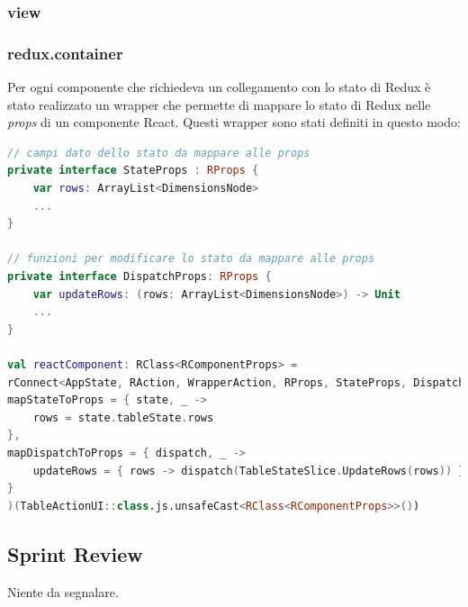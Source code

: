 \subsubsection{view}
\begin{minipage}{\linewidth}
\end{minipage}
\subsubsection{redux.container}
Per ogni componente che richiedeva un collegamento con lo stato di Redux è stato realizzato un wrapper che permette di mappare lo stato di Redux nelle \emph{props} di un componente React. Questi wrapper sono stati definiti in questo modo:
\begin{lstlisting}[caption={BodyCells}, label={lst:bodycells}, language=Kotlin]
// campi dato dello stato da mappare alle props
private interface StateProps : RProps {
	var rows: ArrayList<DimensionsNode>
	...
}

// funzioni per modificare lo stato da mappare alle props
private interface DispatchProps: RProps {
	var updateRows: (rows: ArrayList<DimensionsNode>) -> Unit
	...
}

val reactComponent: RClass<RComponentProps> =
rConnect<AppState, RAction, WrapperAction, RProps, StateProps, DispatchProps, RComponentProps>(
mapStateToProps = { state, _ ->
	rows = state.tableState.rows
},
mapDispatchToProps = { dispatch, _ ->
	updateRows = { rows -> dispatch(TableStateSlice.UpdateRows(rows)) }
}
)(TableActionUI::class.js.unsafeCast<RClass<RComponentProps>>())
\end{lstlisting}
\subsection{Sprint Review}
Niente da segnalare.


